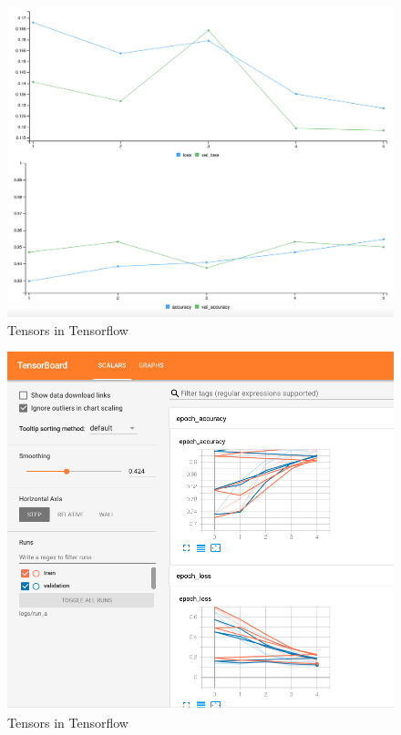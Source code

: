 \documentclass[12pt]{article}
\begin{document}
\begin{figure}

{\centering \includegraphics[width=0.75\linewidth,height=0.25\textheight]{images/dd/graph} 

}

\caption{Tensors in Tensorflow}\label{fig:sample-fig7}
\end{figure}

\begin{figure}

{\centering \includegraphics[width=0.75\linewidth,height=0.25\textheight]{images/dd/tensor} 

}

\caption{Tensors in Tensorflow}\label{fig:sample-fig8}
\end{figure}
\end{document}
